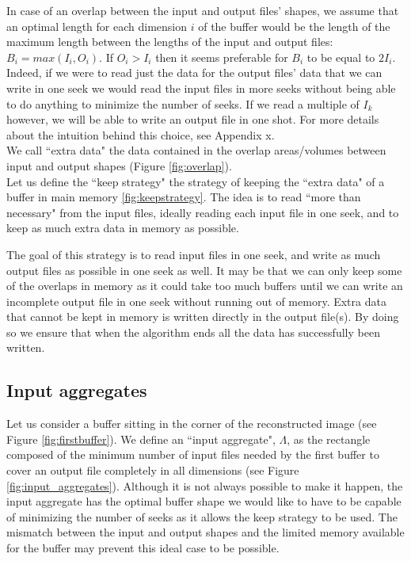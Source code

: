 \documentclass[conference]{IEEEtran}
\begin{document}
In case of an overlap between the input and output files' shapes, we assume that an optimal length for each dimension $i$ of the buffer would be the length of the maximum length between the lengths of the input and output files: $B_i = max(I_i,O_i)$.
If $O_i > I_i$ then it seems preferable for $B_i$ to be equal to $2I_i$.
Indeed, if we were to read just the data for the output files' data that we can write in one seek we would read the input files in more seeks without being able to do anything to minimize the number of seeks.
If we read a multiple of $I_k$ however, we will be able to write an output file in one shot.
For more details about the intuition behind this choice, see Appendix x. \\

We call ``extra data" the data contained in the overlap areas/volumes between input and output shapes (Figure \ref{fig:overlap}). \\
Let us define the ``keep strategy" the strategy of keeping the ``extra data" of a buffer in main memory \ref{fig:keepstrategy}.
The idea is to read ``more than necessary" from the input files, ideally reading each input file in one seek, and to keep as much extra data in memory as possible.

The goal of this strategy is to read input files in one seek, and write as much output files as possible in one seek as well.
It may be that we can only keep some of the overlaps in memory as it could take too much buffers until we can write an incomplete output file in one seek without running out of memory.
Extra data that cannot be kept in memory is written directly in the output file(s).
By doing so we ensure that when the algorithm ends all the data has successfully been written. \\

\subsection{Input aggregates}
Let us consider a buffer sitting in the corner of the reconstructed image (see Figure \ref{fig:firstbuffer}).
We define an ``input aggregate", $\Lambda$, as the rectangle composed of the minimum number of input files needed by the first buffer to cover an output file completely in all dimensions (see Figure \ref{fig:input_aggregates}).
Although it is not always possible to make it happen, the input aggregate has the optimal buffer shape we would like to have to be capable of minimizing the number of seeks as it allows the keep strategy to be used.
The mismatch between the input and output shapes and the limited memory available for the buffer may prevent this ideal case to be possible. \\
\end{document}
